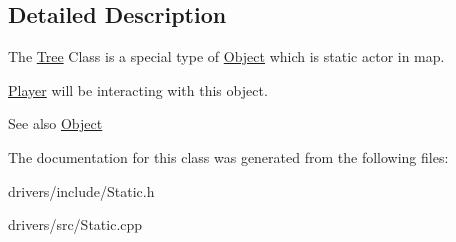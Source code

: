 \subsection{Detailed Description}
The \hyperlink{classTree}{Tree} Class is a special type of \hyperlink{classObject}{Object} which is static actor in map. 

\hyperlink{classPlayer}{Player} will be interacting with this object.

\begin{DoxySeeAlso}{See also}
\hyperlink{classObject}{Object} 
\end{DoxySeeAlso}


The documentation for this class was generated from the following files\+:\begin{DoxyCompactItemize}
\item 
drivers/include/Static.\+h\item 
drivers/src/Static.\+cpp\end{DoxyCompactItemize}
